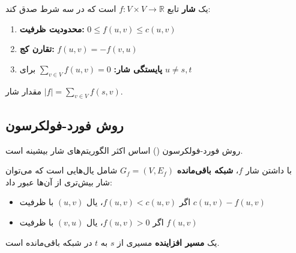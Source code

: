 \documentclass{matinbook}
\begin{document}
    \begin{definition}[شار]
        یک \textbf{شار} تابع
        $f: V \times V \to \mathbb{R}$ است
        که در سه شرط صدق کند:
        \begin{enumerate}
            \item \textbf{محدودیت ظرفیت:}
            $0 \leq f(u, v) \leq c(u, v)$
            \item \textbf{تقارن کج:}
            $f(u, v) = -f(v, u)$
            \item \textbf{پایستگی شار:}
            $\sum_{v \in V} f(u, v) = 0$
            برای $u \neq s, t$
        \end{enumerate}
        مقدار شار $|f| = \sum_{v \in V} f(s, v)$.
        \label{def:flow}
    \end{definition}
    
    \subsection{روش فورد-فولکرسون}
    
    روش فورد-فولکرسون
    () اساس اکثر الگوریتم‌های
    شار بیشینه است.
    
    \begin{definition}
        با داشتن شار $f$، \textbf{شبکه باقی‌مانده}
        $G_{f} = (V, E_{f})$ شامل یال‌هایی است
        که می‌توان شار بیش‌تری از آن‌ها عبور داد:
        \begin{itemize}
            \item اگر $f(u, v) < c(u, v)$،
            یال $(u, v)$ با ظرفیت $c(u, v) - f(u, v)$
            \item اگر $f(u, v) > 0$،
            یال $(v, u)$ با ظرفیت $f(u, v)$
        \end{itemize}
        \label{def:residual-network}
    \end{definition}
    
    \begin{definition}
        یک \textbf{مسیر افزاینده}
        مسیری از $s$ به $t$ در شبکه باقی‌مانده است.
        \label{def:augmenting-path}
    \end{definition}
    
\end{document}
